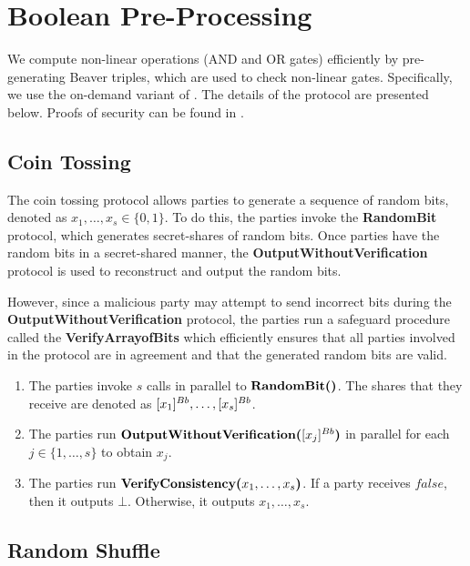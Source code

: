 \section{Boolean Pre-Processing}
\label{sec:preprocessing}

We compute non-linear operations (AND and OR gates) efficiently by pre-generating
Beaver triples, which are used to check non-linear gates.
Specifically, we use the on-demand variant of \cite{SP:ABFLLN17}.
The details of the protocol are presented below.
Proofs of security can be found in \cite{SP:ABFLLN17}.

\subsection{Coin Tossing}

The coin tossing protocol allows parties to generate a sequence of random bits, denoted as $x_1, \ldots, x_s \in \{0, 1\}$. 
To do this, the parties invoke the {\bf RandomBit} protocol, which generates secret-shares of random bits. 
Once parties have the random bits in a secret-shared manner, the {\bf OutputWithoutVerification} protocol is used to reconstruct and output the random bits.

However, since a malicious party may attempt to send incorrect bits during the {\bf OutputWithoutVerification} protocol, the parties run a safeguard procedure called the {\bf VerifyArrayofBits} which efficiently ensures that all parties involved in the protocol are in agreement and that the generated random bits are valid.    

\begin{protocol}
    \label{protocol:coin_toss}
    \begin{enumerate}
        \item The parties invoke $s$ calls in parallel to $\textbf{RandomBit()}$. The shares that they receive are denoted as $[x_1]^{Bb}, \ldots, [x_s]^{Bb}$.
        \item The parties run $\textbf{OutputWithoutVerification(}[x_j]^{Bb}\textbf{)}$ in parallel for each $j \in \{1, \ldots, s\}$ to obtain $x_j$.
        \item The parties run $\textbf{VerifyConsistency(}x_1, \ldots, x_s\textbf{)}$. If a party receives $false$, then it outputs $\bot$. Otherwise, it outputs $x_1, \ldots, x_s$.
    \end{enumerate}
\end{protocol}

\subsection{Random Shuffle}


